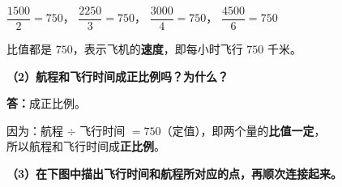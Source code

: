 \noindent
$\dfrac{1500}{2} = 750$，\quad
$\dfrac{2250}{3} = 750$，\quad
$\dfrac{3000}{4} = 750$，\quad
$\dfrac{4500}{6} = 750$

\vspace{0.3cm}

\noindent
比值都是 $750$，表示飞机的\textbf{\textcolor{red!70!black}{速度}}，即每小时飞行 $750$ 千米。

\vspace{0.6cm}

\noindent\textbf{（2）航程和飞行时间成正比例吗？为什么？}

\vspace{0.3cm}

\noindent
\textbf{答：}成正比例。

\vspace{0.2cm}

\noindent
因为：航程 $\div$ 飞行时间 $= 750$（定值），即两个量的\textbf{比值一定}，\\[4pt]
所以航程和飞行时间成\textbf{\textcolor{red!70!black}{正比例}}。

\vspace{0.6cm}

\noindent\textbf{（3）在下图中描出飞行时间和航程所对应的点，再顺次连接起来。}

\vspace{0.4cm}

